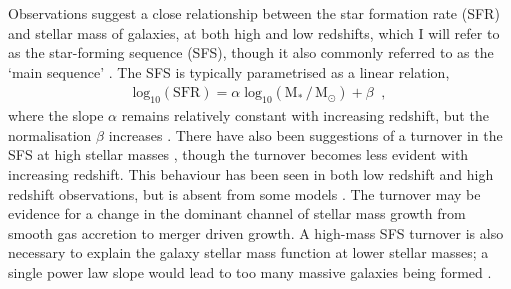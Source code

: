 Observations suggest a close relationship between the star formation rate (SFR) and stellar mass of galaxies, at both high and low redshifts, which I will refer to as the star-forming sequence (SFS), though it also commonly referred to as the `main sequence' \citep{brinchmann_physical_2004,noeske_star_2007,speagle_highly_2014}.
The SFS is typically parametrised as a linear relation,
\begin{align}
  \mathrm{log_{10}(SFR)} = \alpha \; \mathrm{log_{10}(M_{*}\,/\, M_{\odot})} + \beta\;\;,
\end{align}
where the slope $\alpha$ remains relatively constant with increasing redshift, but the normalisation $\beta$ increases \citep{daddi_multiwavelength_2007, santini_star_2009, salmon_relation_2015}.
There have also been suggestions of a turnover in the SFS at high stellar masses \citep{lee_turnover_2015,tasca_evolving_2015}, though the turnover becomes less evident with increasing redshift.
This behaviour has been seen in both low redshift \citep{lee_turnover_2015} and high redshift \citep{tasca_evolving_2015, santini_star_2017} observations, but is absent from some models \citep[\textit{e.g.} Illustris, ][]{sparre_star_2015}.
The turnover may be evidence for a change in the dominant channel of stellar mass growth from smooth gas accretion to merger driven growth.
A high-mass SFS turnover is also necessary to explain the galaxy stellar mass function at lower stellar masses; a single power law slope would lead to too many massive galaxies being formed \citep{leja_reconciling_2015}.


